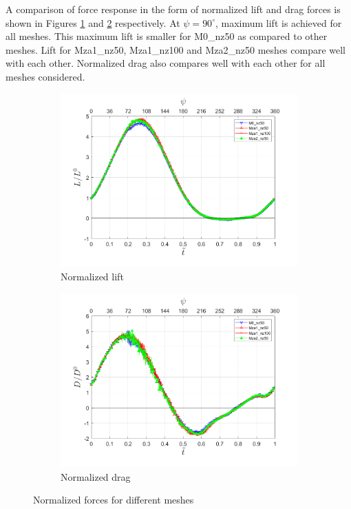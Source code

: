 
A comparison of force response in the form of normalized lift and drag forces is shown in Figures \ref{fig:lift_zonal_adapt_Re200k} and \ref{fig:drag_zonal_adapt_Re200k} respectively. 
At $\psi=90^\circ$, maximum lift is achieved for all meshes.
This maximum lift is smaller for M0\_nz50 as compared to other meshes. 
Lift for Mza1\_nz50, Mza1\_nz100 and Mza2\_nz50 meshes compare well with each other.
Normalized drag also compares well with each other for all meshes considered.



\begin{figure}[H]
	\centering
	
	\begin{subfigure}[b]{0.7\textwidth}
		\centering
		\includegraphics[width=1\textwidth]{figures/zonal_adapt_results/force_response_Re200k/Lift_inst.png}
		\caption{Normalized lift}
		\label{fig:lift_zonal_adapt_Re200k}
	\end{subfigure}
	\begin{subfigure}[b]{0.7\textwidth}
		\centering
		\includegraphics[width=1\textwidth]{figures/zonal_adapt_results/force_response_Re200k/Drag_inst.png}
		\caption{Normalized drag}
		\label{fig:drag_zonal_adapt_Re200k}
	\end{subfigure}
	
	\label{fig:force_response_zonal_adapt_Re200k}
	\caption{Normalized forces for different meshes}
\end{figure}